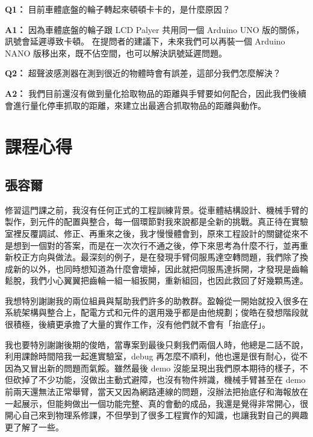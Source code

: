 \documentclass[12pt]{article}
\begin{document}
\vspace{1em}
\noindent \textbf{Q1：}
目前車體底盤的輪子轉起來頓頓卡卡的，是什麼原因？
\vspace{0.5em}

\noindent \textbf{A1：}
因為車體底盤的輪子跟 LCD Palyer 共用同一個 Arduino UNO 版的關係，訊號會延遲導致卡頓。
在提問者的建議下，未來我們可以再裝一個 Arduino NANO 版移出來，既不佔空間，也可以解決訊號延遲問題。
\vspace{1.5em}

\noindent \textbf{Q2：}
超聲波感測器在測到很近的物體時會有誤差，這部分我們怎麼解決？
\vspace{0.5em}

\noindent \textbf{A2：}
我們目前還沒有做到量化拾取物品的距離與手臂要如何配合，因此我們後續會進行量化停車抓取的距離，來建立出最適合抓取物品的距離與動作。
\vspace{1.5em}

\section{課程心得}
\subsection*{張容爾}

修習這門課之前，我沒有任何正式的工程訓練背景。從車體結構設計、機械手臂的製作，到元件的配置與整合，每一個環節對我來說都是全新的挑戰。真正待在實驗室裡反覆調試、修正、再重來之後，我才慢慢體會到，原來工程設計的關鍵從來不是想到一個對的答案，而是在一次次行不通之後，停下來思考為什麼不行，並再重新校正方向與做法。最深刻的例子，是在發現手臂伺服馬達空轉問題，我們除了換成新的以外，也同時想知道為什麼會壞掉，因此就把伺服馬達拆開，才發現是齒輪鬆脫，我們小心翼翼把齒輪一組一組扳開，重新組回，也因此救回了好幾顆馬達。

我想特別謝謝我的兩位組員與幫助我們許多的助教群。盈翰從一開始就投入很多在系統架構與整合上，配電方式和元件的選用幾乎都是由他規劃；俊皓在發想階段就很積極，後續更承擔了大量的實作工作，沒有他們就不會有「抬底仔」。

我也要特別謝謝後期的俊皓，當專案到最後只剩我們兩個人時，他總是二話不說，利用課餘時間陪我一起進實驗室，debug 再怎麼不順利，他也還是很有耐心，從不因為又冒出新的問題而氣餒。雖然最後 demo 沒能呈現出我們原本期待的樣子，不但砍掉了不少功能，沒做出主動式避障，也沒有物件辨識，機械手臂甚至在 demo 前兩天還無法正常舉臂，當天又因為網路連線的問題，沒辦法把抬底仔和海報放在一起展示，但能夠做出一個功能完整、真的會動的成品，我還是覺得非常開心，很開心自己來到物理系修課，不但學到了很多工程實作的知識，也讓我對自己的興趣更了解了一些。
\end{document}
